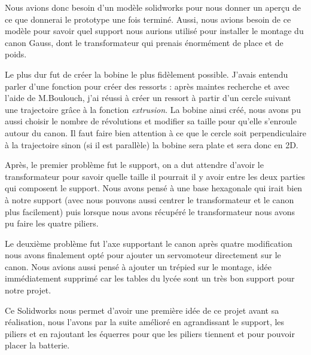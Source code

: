 Nous avions donc besoin d'un modèle solidworks pour nous donner un aperçu de ce que donnerai le prototype une fois terminé. Aussi, nous avions besoin de ce modèle pour savoir quel support nous aurions utilisé pour installer le montage du canon Gauss, dont le transformateur qui prenais énormément de place et de poids.

Le plus dur fut de créer la bobine le plus fidèlement possible. J'avais entendu parler d'une fonction pour créer des ressorts : après maintes recherche et avec l'aide de M.Boulouch, j'ai réussi à créer un ressort à partir d'un cercle suivant une trajectoire grâce à la fonction \emph{extrusion}. La bobine ainsi créé, nous avons pu aussi choisir le nombre de révolutions et modifier sa taille pour qu'elle s'enroule autour du canon. Il faut faire bien attention à ce que le cercle soit perpendiculaire à la trajectoire sinon (si il est parallèle) la bobine sera plate et sera donc en 2D. 

Après, le premier problème fut le support, on a dut attendre d'avoir le transformateur pour savoir quelle taille il pourrait il y avoir entre les deux parties qui composent le support. Nous avons pensé à une base hexagonale qui irait bien à notre support (avec nous pouvons aussi centrer le transformateur et le canon plus facilement) puis lorsque nous avons récupéré le transformateur nous avons pu faire les quatre piliers.

Le deuxième problème fut l'axe supportant le canon après quatre modification nous avons finalement opté pour ajouter un servomoteur directement sur le canon. Nous avions aussi pensé à ajouter un trépied sur le montage, idée immédiatement supprimé car les tables du lycée sont un très bon support pour notre projet.

Ce Solidworks nous permet d'avoir une première idée de ce projet avant sa réalisation, nous l'avons par la suite amélioré en agrandissant le support, les piliers et en rajoutant les équerres pour que les piliers tiennent et pour pouvoir placer la batterie. 
